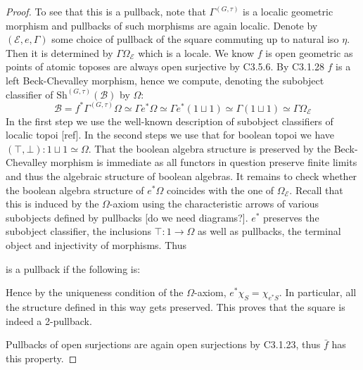 \documentclass[a4paper]{amsproc}
\theoremstyle{plain}
\theoremstyle{definition}
\theoremstyle{remark}
\numberwithin{equation}{section}
\begin{document}
\begin{proof} To see that this is a pullback, note that $\Gamma^{(G,\tau)}$ is a localic geometric morphism and pullbacks of such morphisms are again localic. Denote by $(\mathcal{E},e,\Gamma)$ some choice of pullback of the square commuting up to natural iso $\eta$. Then it is determined by $\Gamma \Omega_\mathcal{E}$ which is a locale. We know $f$ is open geometric as points of atomic toposes are always open surjective by C3.5.6. By C3.1.28 $f$ is a left Beck-Chevalley morphism, hence we compute, denoting the subobject classifier of $\text{Sh}^{(G,\tau)}(\mathcal{B})$ by $\Omega$:
\[ \mathcal{B}=f^*\Gamma^{(G,\tau)}\Omega\simeq \Gamma e^*\Omega\simeq \Gamma e^*(1\sqcup 1)\simeq \Gamma (1\sqcup 1)\simeq\Gamma \Omega_\mathcal{E}  \]
\newline
In the first step we use the well-known description of subobject classifiers of localic topoi [ref]. In the second steps we use that for boolean topoi we have $(\top,\bot):1\sqcup 1\simeq \Omega$. That the boolean algebra structure is preserved  by the Beck-Chevalley morphism is immediate as all functors in question preserve finite limits and thus the algebraic structure of boolean algebras. It remains to check whether the boolean algebra structure of $ e^*\Omega$ coincides with the one of $ \Omega_\mathcal{E}$. Recall that this is induced by the $\Omega$-axiom using the characteristic arrows of various subobjects defined by pullbacks [do we need diagrams?]. $e^*$ preserves the subobject classifier, the inclusions $\top:1\rightarrow \Omega$ as well as pullbacks, the terminal object and injectivity of morphisms. Thus 
\begin{center}
\end{center}
\indent is a pullback if the following is:
\begin{center}
\end{center}
Hence by the uniqueness condition of the $\Omega$-axiom, $e^*\chi_S=\chi_{e^*S}$. In particular, all the structure defined in this way gets preserved. This proves that the square is indeed a 2-pullback.

\indent Pullbacks of open surjections are again open surjections by C3.1.23, thus $\bar{f}$ has this property. 
\end{proof}
\end{document}
